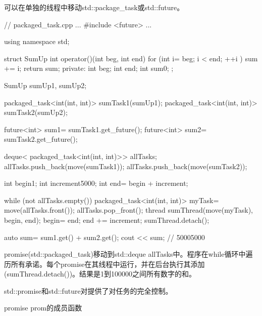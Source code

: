 可以在单独的线程中移动std::package\_task或std::future。


\begin{cpp}
// packaged_task.cpp
...
#include <future>
...

using namespace std;

struct SumUp{
	int operator()(int beg, int end){
		for (int i= beg; i < end; ++i ) sum += i;
		return sum;
	}
	private:
	int beg;
	int end;
	int sum{0};
};

SumUp sumUp1, sumUp2;

packaged_task<int(int, int)> sumTask1(sumUp1);
packaged_task<int(int, int)> sumTask2(sumUp2);

future<int> sum1= sumTask1.get_future();
future<int> sum2= sumTask2.get_future();

deque< packaged_task<int(int, int)>> allTasks;
allTasks.push_back(move(sumTask1));
allTasks.push_back(move(sumTask2));

int begin{1};
int increment{5000};
int end= begin + increment;

while (not allTasks.empty()){
	packaged_task<int(int, int)> myTask= move(allTasks.front());
	allTasks.pop_front();
	thread sumThread(move(myTask), begin, end);
	begin= end;
	end += increment;
	sumThread.detach();
}

auto sum= sum1.get() + sum2.get();
cout << sum; // 50005000
\end{cpp}

promise(std::packaged\_task)移动到std::deque allTasks中。程序在while循环中遍历所有承诺。每个promise在其线程中运行，并在后台执行其添加(sumThread.detach())。结果是1到100000之间所有数字的和。


std::promise和std::future对提供了对任务的完全控制。

\begin{center}
promise prom的成员函数
\end{center}

